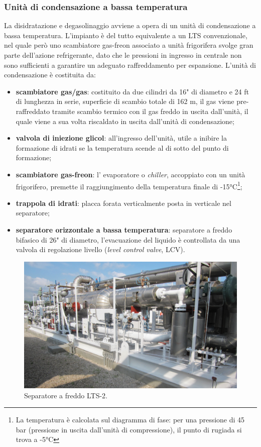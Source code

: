 \subsubsection*{Unità di condensazione a bassa temperatura}
La disidratazione e degasolinaggio avviene a opera di un unità di condensazione a bassa temperatura. L'impianto è del tutto equivalente a un LTS convenzionale, nel quale però uno scambiatore gas-freon associato a unità frigorifera svolge gran parte dell'azione refrigerante, dato che le pressioni in ingresso in centrale non sono sufficienti a garantire un adeguato raffreddamento per espansione. L'unità di condensazione è costituita da:
\begin{itemize}
	\item \textbf{scambiatore gas/gas}: costituito da due cilindri da 16" di diametro e 24 ft di lunghezza in serie, superficie di scambio totale di 162 m, il gas viene pre-raffreddato tramite scambio termico con il gas freddo in uscita dall'unità, il quale viene a sua volta riscaldato in uscita dall'unità di condensazione;
	\item \textbf{valvola di iniezione glicol}: all'ingresso dell'unità, utile a inibire la formazione di idrati se la temperatura scende al di sotto del punto di formazione;
	\item \textbf{scambiatore gas-freon}: l' evaporatore o \textit{chiller}, accoppiato con un unità frigorifero, premette il raggiungimento della temperatura finale di -15°C\footnote{La temperatura è calcolata sul diagramma di fase: per una pressione di 45 bar (pressione in uscita dall'unità di compressione), il punto di rugiada si trova a -5°C};
	\item \textbf{trappola di idrati}: placca forata verticalmente posta in verticale nel separatore;
	\item \textbf{separatore orizzontale a bassa temperatura}: separatore a freddo bifasico di 26" di diametro, l'evacuazione del liquido è controllata da una valvola di regolazione livello (\textit{level control valve}, LCV).
\end{itemize}

\begin{figure}[htbp] 
    \centering
    \includegraphics[width=.8\textwidth]{fig/test/centrale/lts.jpg}
    \caption{Separatore a freddo LTS-2.} 
    \label{fig:centrale-lts}
\end{figure}

